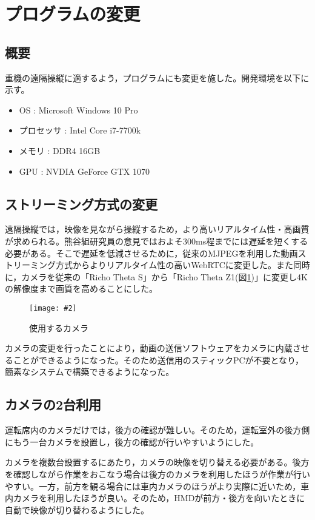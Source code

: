 \documentclass[a4paper,12pt]{jsarticle}
\newcommand{\figuref}[1]{図\ref{#1}}
\newcommand{\fig}[4][width=\textwidth]{
    \begin{figure}[!h]
    \begin{center}
    \texttt{[image: \#2]}
    \caption{#3}
    \label{#4}
    \vspace*{-1cm}
    \end{center}
    \end{figure}
}
\begin{document}
\clearpage

\section{プログラムの変更}
\subsection{概要}
重機の遠隔操縦に適するよう，プログラムにも変更を施した。開発環境を以下に示す。
\begin{itemize}
    \item OS : Microsoft Windows 10 Pro
    \item プロセッサ : Intel Core i7-7700k
    \item メモリ : DDR4 16GB
    \item GPU : NVDIA GeForce GTX 1070
\end{itemize}

\subsection{ストリーミング方式の変更}
遠隔操縦では，映像を見ながら操縦するため，より高いリアルタイム性・高画質が求められる。熊谷組研究員の意見ではおよそ300ms程までには遅延を短くする必要がある。そこで遅延を低減させるために，従来のMJPEGを利用した動画ストリーミング方式からよりリアルタイム性の高いWebRTCに変更した。また同時に，カメラを従来の「Richo Theta S」から「Richo Theta Z1(\figuref{theta})」に変更し4Kの解像度まで画質を高めることにした。

\fig[width=7cm]{image/theta.jpg}{使用するカメラ}{theta}

カメラの変更を行ったことにより，動画の送信ソフトウェアをカメラに内蔵させることができるようになった。そのため送信用のスティックPCが不要となり，簡素なシステムで構築できるようになった。

\subsection{カメラの2台利用}
運転席内のカメラだけでは，後方の確認が難しい。そのため，運転室外の後方側にもう一台カメラを設置し，後方の確認が行いやすいようにした。

カメラを複数台設置するにあたり，カメラの映像を切り替える必要がある。後方を確認しながら作業をおこなう場合は後方のカメラを利用したほうが作業が行いやすい。一方，前方を観る場合には車内カメラのほうがより実際に近いため，車内カメラを利用したほうが良い。そのため，HMDが前方・後方を向いたときに自動で映像が切り替わるようにした。
\end{document}

